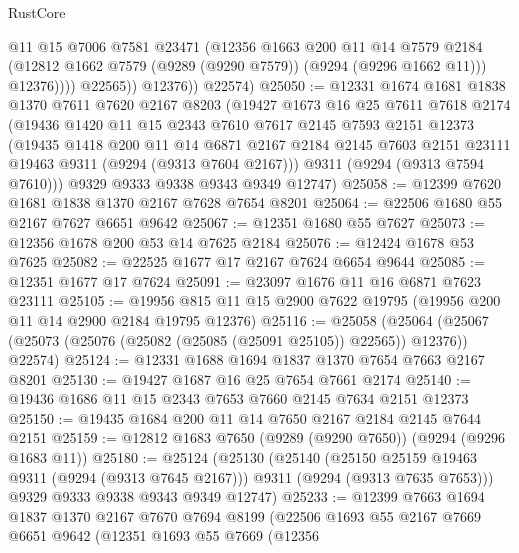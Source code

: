 \begin{lexlean}{RustCore}
\begin{coremodule}
                    @11
                    @15
                    @7006
                    @7581
                    @23471
                    (@12356
                      @1663
                      @200
                      @11
                      @14
                      @7579
                      @2184
                      (@12812 @1662 @7579 (@9289 (@9290 @7579)) (@9294 (@9296 @1662 @11)))
                      @12376))))
              @22565))
          @12376))
      @22574)
@25050 := @12331
    @1674
    @1681
    @1838
    @1370
    @7611
    @7620
    @2167
    @8203
    (@19427
      @1673
      @16
      @25
      @7611
      @7618
      @2174
      (@19436
        @1420
        @11
        @15
        @2343
        @7610
        @7617
        @2145
        @7593
        @2151
        @12373
        (@19435
          @1418
          @200
          @11
          @14
          @6871
          @2167
          @2184
          @2145
          @7603
          @2151
          @23111
          @19463
          @9311
          (@9294 (@9313 @7604 @2167)))
        @9311
        (@9294 (@9313 @7594 @7610)))
      @9329
      @9333
      @9338
      @9343
      @9349
      @12747)
@25058 := @12399 @7620 @1681 @1838 @1370 @2167 @7628 @7654 @8201
@25064 := @22506 @1680 @55 @2167 @7627 @6651 @9642
@25067 := @12351 @1680 @55 @7627
@25073 := @12356 @1678 @200 @53 @14 @7625 @2184
@25076 := @12424 @1678 @53 @7625
@25082 := @22525 @1677 @17 @2167 @7624 @6654 @9644
@25085 := @12351 @1677 @17 @7624
@25091 := @23097 @1676 @11 @16 @6871 @7623 @23111
@25105 := @19956 @815 @11 @15 @2900 @7622 @19795 (@19956 @200 @11 @14 @2900 @2184 @19795 @12376)
@25116 := @25058
    (@25064 (@25067 (@25073 (@25076 (@25082 (@25085 (@25091 @25105)) @22565)) @12376)) @22574)
@25124 := @12331 @1688 @1694 @1837 @1370 @7654 @7663 @2167 @8201
@25130 := @19427 @1687 @16 @25 @7654 @7661 @2174
@25140 := @19436 @1686 @11 @15 @2343 @7653 @7660 @2145 @7634 @2151 @12373
@25150 := @19435 @1684 @200 @11 @14 @7650 @2167 @2184 @2145 @7644 @2151
@25159 := @12812 @1683 @7650 (@9289 (@9290 @7650)) (@9294 (@9296 @1683 @11))
@25180 := @25124
    (@25130
      (@25140
        (@25150 @25159 @19463 @9311 (@9294 (@9313 @7645 @2167)))
        @9311
        (@9294 (@9313 @7635 @7653)))
      @9329
      @9333
      @9338
      @9343
      @9349
      @12747)
@25233 := @12399
    @7663
    @1694
    @1837
    @1370
    @2167
    @7670
    @7694
    @8199
    (@22506
      @1693
      @55
      @2167
      @7669
      @6651
      @9642
      (@12351
        @1693
        @55
        @7669
        (@12356

\end{coremodule}
\end{lexlean}
